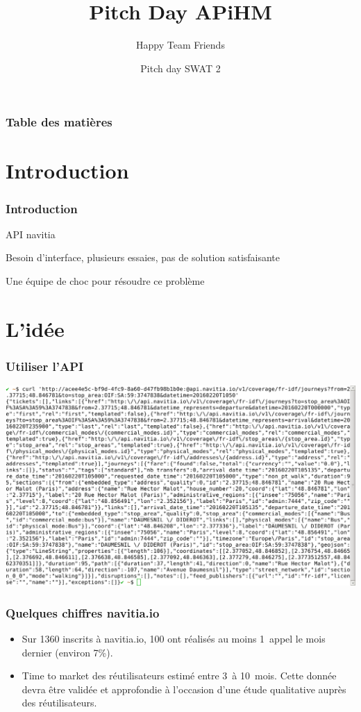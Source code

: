 \documentclass[table]{beamer}
\title{Pitch Day APiHM}
\author{Happy Team Friends}
\institute[Kisio Digital] %
{
  Kisio Digital\\
  20 rue Hector Malot\\
  75012 Paris, France}
\date{Pitch day SWAT 2}
\begin{document}
\begin{frame}
  \titlepage    
\end{frame}

\begin{frame}%
  \frametitle{Table des matières}
  \tableofcontents[hideallsubsections]
\end{frame}

\section{Introduction}

\begin{frame}
  \frametitle{Introduction}

  API navitia

  Besoin d'interface, plusieurs essaies, pas de solution satisfaisante

  Une équipe de choc pour résoudre ce problème
\end{frame}

\section{L'idée}

\begin{frame}[fragile]
  \frametitle{Utiliser l'API}
  
  \centering\includegraphics[width=\linewidth]{images/curl}
\end{frame}

\begin{frame}
  \frametitle{Quelques chiffres navitia.io}

  \begin{itemize}
  \item Sur 1360 inscrits à navitia.io, 100 ont réalisés au moins
    1~appel le mois dernier (environ 7\%).
  \item Time to market des réutilisateurs estimé entre 3~à 10~mois.
    Cette donnée devra être validée et approfondie à l'occasion d'une
    étude qualitative auprès des réutilisateurs.
  \end{itemize}
\end{frame}
\end{document}
